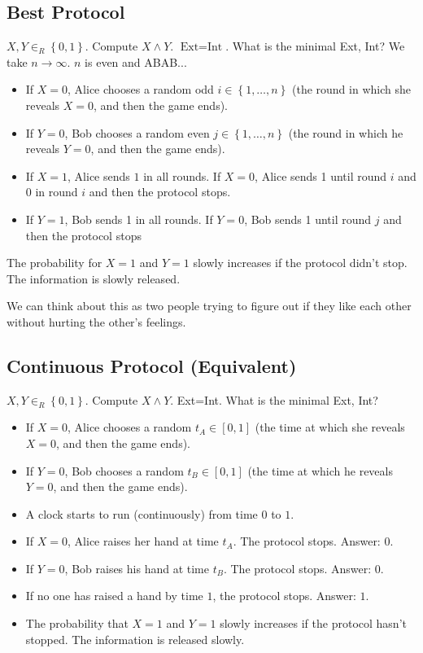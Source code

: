 \documentclass{article}
\begin{document}
\subsection{Best Protocol}

$X,Y\in_R \left\{0,1\right\}$. Compute $X\wedge Y$. $\text{Ext}=\text{Int}$. What is the minimal Ext, Int? We take $n\to \infty$. $n$ is even and ABAB... 

\begin{itemize}
    \item If $X=0$, Alice chooses a random odd $i\in\left\{1,\ldots,n\right\}$ (the round in which she reveals $X=0$, and then the game ends).
    \item If $Y=0$, Bob chooses a random even $j\in \left\{1,\ldots,n\right\}$ (the round in which he reveals $Y=0$, and then the game ends).
    \item If $X=1$, Alice sends $1$ in all rounds. If $X=0$, Alice sends 1 until round $i$ and $0$ in round $i$ and then the protocol stops.
    \item If $Y=1$, Bob sends 1 in all rounds. If $Y=0$, Bob sends 1 until round $j$ and then the protocol stops
\end{itemize}
The probability for $X=1$ and $Y=1$ slowly increases if the protocol didn't stop. The information is slowly released.

We can think about this as two people trying to figure out if they like each other without hurting the other's feelings.

\subsection{Continuous Protocol (Equivalent)}

$X,Y\in_R \left\{0,1\right\}$. Compute $X\wedge Y$. Ext=Int. What is the minimal Ext, Int?

\begin{itemize}
    \item If $X=0$, Alice chooses a random $t_A\in[0,1]$ (the time at which she reveals $X=0$, and then the game ends).
    \item If $Y=0$, Bob chooses a random $t_B\in[0,1]$ (the time at which he reveals $Y=0$, and then the game ends).
    \item A clock starts to run (continuously) from time $0$ to $1$.
    \item If $X=0$, Alice raises her hand at time $t_A$. The protocol stops. Answer: $0$.
    \item If $Y=0$, Bob raises his hand at time $t_B$. The protocol stops. Answer: $0$.
    \item If no one has raised a hand by time $1$, the protocol stops. Answer: $1$.
    \item The probability that $X=1$ and $Y=1$ slowly increases if the protocol hasn't stopped. The information is released slowly.
\end{itemize}
\end{document}
